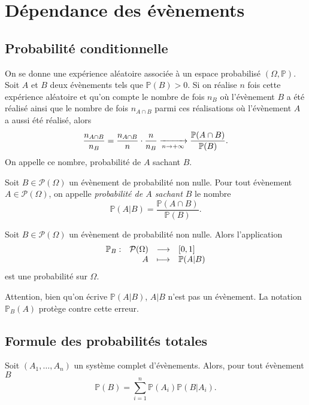 \documentclass{magnolia}
\begin{document}
\section{Dépendance des évènements}

\subsection{Probabilité conditionnelle}

On se donne une expérience aléatoire associée à un espace probabilisé $(\Omega,\mathbb{P})$.
Soit $A$ et $B$ deux évènements tels que $\mathbb{P}(B)>0$. Si on réalise $n$ fois cette
expérience aléatoire et qu'on compte le nombre de fois $n_B$ où l'évènement $B$ a été réalisé
ainsi que le nombre de fois $n_{A\cap B}$ parmi ces réalisations où l'évènement $A$ a aussi
été réalisé, alors
\[\frac{n_{A\cap B}}{n_B}=\frac{n_{A\cap B}}{n}\cdot\frac{n}{n_B}
  \xrightarrow[n\rightarrow +\infty]{} \frac{\mathbb{P}(A\cap B)}{\mathbb{P}(B)}.\]
On appelle ce nombre, probabilité de $A$ sachant $B$.

\begin{definition}
Soit $B\in\mathcal{P}(\Omega)$ un évènement
de probabilité non nulle. Pour tout évènement $A\in\mathcal{P}(\Omega)$, on appelle
\emph{probabilité de $A$ sachant $B$} le nombre
\[\mathbb{P}(A|B)=\frac{\mathbb{P}(A\cap B)}{\mathbb{P}(B)}.\]
\end{definition}

\begin{proposition}
Soit $B\in\mathcal{P}(\Omega)$ un évènement
de probabilité non nulle. Alors l'application
\[\begin{array}[t]{lrcl} \displaystyle{\mathbb{P}_B} : & \displaystyle{\mathcal{P}(\Omega)} & \longrightarrow & \displaystyle{\left[0,1\right]} \\ & \displaystyle{A} & \longmapsto & \displaystyle{\mathbb{P}(A|B)} \end{array}\]
est une probabilité sur $\Omega$.
\end{proposition}

\begin{remarqueUnique}
\remarque Attention, bien qu'on écrive $\mathbb{P}(A|B)$, $A|B$ n'est pas un évènement.
  La notation $\mathbb{P}_B(A)$ protège contre cette erreur.
\end{remarqueUnique}

\subsection{Formule des probabilités totales}

\begin{proposition}[nom={Formule des probabilités totales}]
Soit $(A_1,\ldots,A_n)$ un système complet d'évènements. Alors, pour tout évènement $B$
\[\mathbb{P}(B)=\sum_{i=1}^n \mathbb{P}(A_i)\mathbb{P}(B|A_i).\]
\end{proposition}
\end{document}
